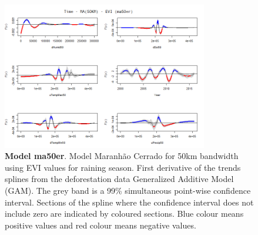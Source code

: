 \begin{table}
\begin{figure}[H]
 \centering
        \centering
        \includegraphics[width=0.8\textwidth]{ma50er.png} %
        \caption[Model Cerrado Maranhão for 50km bandwidth using EVI values for raining season. First derivative of the trends splines from the deforestation data Generalized Additive Model (GAM)]{\textbf{Model ma50er}. Model Maranhão Cerrado for 50km bandwidth using EVI values for raining season. First derivative of the trends splines from the deforestation data Generalized Additive Model (GAM). The grey band is a 99\% simultaneous point-wise confidence interval. Sections of the spline where the confidence interval does not include zero are indicated by coloured sections. Blue colour means positive values and red colour means negative values.}
\end{figure}
\end{table}

